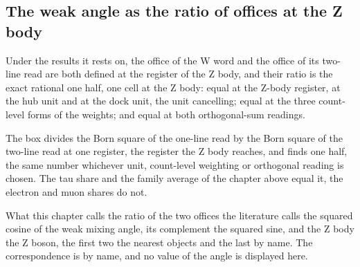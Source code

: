 \subsection{The weak angle as the ratio of offices at the Z body}\label{mod:VI-6-D539022-wazb-t1}
\begin{chconditional}\label{box:VI-6-D539022-wazb-t1:1}
Under the results it rests on, the office of the W word and the office of its two-line read are both defined at the register of the Z body, and their ratio is the exact rational one half, one cell at the Z body: equal at the Z-body register, at the hub unit and at the dock unit, the unit cancelling; equal at the three count-level forms of the weights; and equal at both orthogonal-sum readings.
\end{chconditional}
The box divides the Born square of the one-line read by the Born square of the two-line read at one register, the register the Z body reaches, and finds one half, the same number whichever unit, count-level weighting or orthogonal reading is chosen. The tau share and the family average of the chapter above equal it, the electron and muon shares do not.
\begin{chbridge}
What this chapter calls the ratio of the two offices the literature calls the squared cosine of the weak mixing angle, its complement the squared sine, and the Z body the Z boson, the first two the nearest objects and the last by name. The correspondence is by name, and no value of the angle is displayed here.
\end{chbridge}
